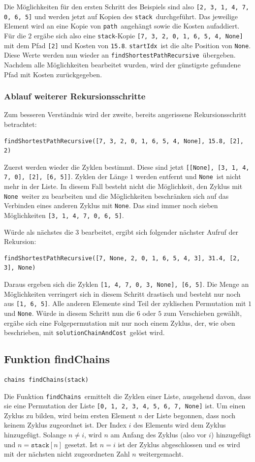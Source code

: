 \documentclass{fh-ium-bama}
\newcommand{\stack}{\lstinline|stack|}
\newcommand{\path}{\lstinline|path|}
\newcommand{\startIdx}{\lstinline|startIdx|}
\newcommand{\findChains}{\lstinline|findChains|}
\newcommand{\findSPR}{\lstinline|findShortestPathRecursive|}
\newcommand{\None}{\lstinline|None|}
\newcommand{\solcnc}{\lstinline|solutionChainAndCost|}
\begin{document}
Die Möglichkeiten für den ersten Schritt des Beispiels sind also \lstinline|[2, 3, 1, 4, 7, 0, 6, 5]| und werden jetzt auf Kopien des \stack\ durchgeführt. Das jeweilige Element wird an eine Kopie von \path\ angehängt sowie die Kosten aufaddiert. Für die $2$ ergäbe sich also eine \stack-Kopie \lstinline|[7, 3, 2, 0, 1, 6, 5, 4, None]| mit dem Pfad \lstinline|[2]| und Kosten von \lstinline|15.8|. \startIdx\ ist die alte Position von \None. Diese Werte werden nun wieder an \findSPR\ übergeben. Nachdem alle Möglichkeiten bearbeitet wurden, wird der günstigste gefundene Pfad mit Kosten zurückgegeben.

\subsubsection*{Ablauf weiterer Rekursionsschritte}
Zum besseren Verständnis wird der zweite, bereits angerissene Rekursionsschritt betrachtet:
\begin{lstlisting}
findShortestPathRecursive([7, 3, 2, 0, 1, 6, 5, 4, None], 15.8, [2], 2)
\end{lstlisting}
Zuerst werden wieder die Zyklen bestimmt. Diese sind jetzt \lstinline|[[None], [3, 1, 4, 7, 0], [2], [6, 5]]|. Zyklen der Länge $1$ werden entfernt und \None\ ist nicht mehr in der Liste. In diesem Fall besteht nicht die Möglichkeit, den Zyklus mit \None\ weiter zu bearbeiten und die Möglichkeiten beschränken sich auf das Verbinden eines anderen Zyklus mit \None. Das sind immer noch sieben Möglichkeiten \lstinline|[3, 1, 4, 7, 0, 6, 5]|.

Würde als nächstes die $3$ bearbeitet, ergibt sich folgender nächster Aufruf der Rekursion:
\begin{lstlisting}
findShortestPathRecursive([7, None, 2, 0, 1, 6, 5, 4, 3], 31.4, [2, 3], None)
\end{lstlisting}
Daraus ergeben sich die Zyklen \lstinline|[1, 4, 7, 0, 3, None], [6, 5]|. Die Menge an Möglichkeiten verringert sich in diesem Schritt drastisch und besteht nur noch aus \lstinline|[1, 6, 5]|. Alle anderen Elemente sind Teil der zyklischen Permutation mit $1$ und \None.
Würde in diesem Schritt nun die $6$ oder $5$ zum Verschieben gewählt, ergäbe sich eine Folgepermutation mit nur noch einem Zyklus, der, wie oben beschrieben, mit \solcnc\ gelöst wird.

\newpage
\subsection{Funktion findChains}
\begin{lstlisting}
chains findChains(stack)
\end{lstlisting}
Die Funktion \findChains\ ermittelt die Zyklen einer Liste, ausgehend davon, dass sie eine Permutation der Liste \lstinline|[0, 1, 2, 3, 4, 5, 6, 7, None]| ist. Um einen Zyklus zu bilden, wird beim ersten Element $n$ der Liste begonnen, dass noch keinem Zyklus zugeordnet ist.
Der Index $i$ des Elements wird dem Zyklus hinzugefügt. Solange $n \ne i$, wird $n$ am Anfang des Zyklus (also vor $i$) hinzugefügt und $n = \texttt{stack}[n]$ gesetzt. Ist $n = i$ ist der Zyklus abgeschlossen und es wird mit der nächsten nicht zugeordneten Zahl $n$ weitergemacht.
\end{document}
